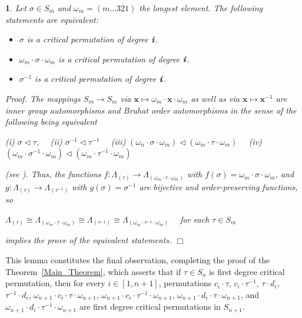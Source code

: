 \documentclass[a4 paper,12pt]{article}
\newcommand{\sma}{\triangleleft}
\newtheorem{numeris}{}[section]
\begin{document}
\begin{numeris} 	\textit{Let $\sigma \in S_m$ and $\omega_m=(m\ldots 321) $ the  longest element. The
following statements are equivalent:}
\begin{itemize}
	\item[(i)] \textit{$\sigma$ is a critical permutation of degree $\textbf{\textit{i}}$.}
	\item[(ii)] \textit{$\omega_m \cdot  \sigma \cdot  \omega_m$ is a critical permutation of degree $\textbf{\textit{i}}$.}
	\item[(iii)] \textit{$\sigma^{-1}$ is a critical permutation of degree $\textbf{\textit{i}}$.}
\end{itemize}
\textit{Proof.} The mappings $S_m \to S_m$ via $\textbf{x} \mapsto \omega_m\cdot  \textbf{x} \cdot  \omega_{m}$ as well as via $\textbf{x} \mapsto \textbf{x}^{-1}$ are inner group automorphisms and  Bruhat order automorphisms   in the sense of the following being equivalent 
  \begin{center}
	(i) $\sigma \sma \tau $, \  \      (ii)  $\sigma^{-1} \sma \tau^{-1} $  \  \    (iii) $\left(\omega_n\cdot  \sigma \cdot  \omega_m \right) \sma \left(\omega_m\cdot \tau \cdot  \omega_m\right) $   \  \    (iv) $\left(\omega_m\cdot  \sigma^{-1} \cdot  \omega_m \right) \sma \left(\omega_m\cdot \tau^{-1} \cdot  \omega_m\right)$ 
\end{center}
	 (see  \cite[Proposition 3.1.5 ]{Bjor}). 
 Thus, the functions $f:\Lambda_{(\tau)} \to \Lambda_{(\omega_m\cdot \tau\cdot \omega_m)}$ with $f(\sigma)= \omega_m\cdot \sigma\cdot \omega_m$,  and $g:\Lambda_{(\tau)} \to \Lambda_{(\tau^{-1})}$ with $g(\sigma) = \sigma^{-1}$ are bijective and order-preserving functions, so 
\begin{center}
$\Lambda_{(\tau)}  \cong \Lambda_{(\omega_m\cdot \tau\cdot \omega_m)} \cong \Lambda_{(\tau^{-1})} \cong \Lambda_{(\omega_m\cdot \tau^{-1}\cdot \omega_m)}$ \  \  for each $\tau\in S_m$
\end{center}
implies the prove of the equivalent statements.      \hfill $\Box$ 
\label{critical_if_and_only_if}
\end{numeris}

This lemma constitutes the final observation, completing the proof of the  Theorem~\ref{Main_Theorem}, which asserts that if  $\tau\in S_n$ is first degree critical permutation, then for every $i\in \left[1, n+1\right]$, permutations
$c_i\cdot \tau$,   $c_i\cdot \tau^{-1}$,   $\tau\cdot d_i$,  $\tau^{-1}\cdot d_i$,  $\omega_{n+1}\cdot c_i\cdot \tau \cdot \omega_{n+1}$, $\omega_{n+1}\cdot c_i\cdot \tau^{-1} \cdot \omega_{n+1}$,   $\omega_{n+1}\cdot d_i \cdot \tau \cdot \omega_{n+1}$, and  $\omega_{n+1}\cdot d_i \cdot \tau^{-1} \cdot \omega_{n+1}$ are first degree critical permutations in $S_{n+1}$.\\
\end{document}
